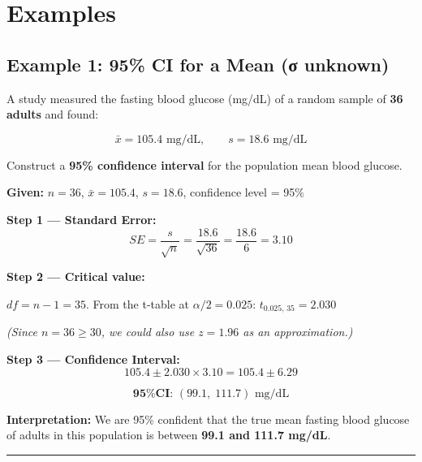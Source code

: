 \documentclass[
  12pt,
  letterpaper,
]{book}
\begin{document}

\chapter{Examples}\label{examples-3}

\section{Example 1: 95\% CI for a Mean (σ
unknown)}\label{example-1-95-ci-for-a-mean-ux3c3-unknown}

A study measured the fasting blood glucose (mg/dL) of a random sample of
\textbf{36 adults} and found:

\[\bar{x} = 105.4 \text{ mg/dL}, \qquad s = 18.6 \text{ mg/dL}\]

Construct a \textbf{95\% confidence interval} for the population mean
blood glucose.

\begin{tcolorbox}[enhanced jigsaw, arc=.35mm, bottomrule=.15mm, bottomtitle=1mm, breakable, colback=white, colbacktitle=quarto-callout-tip-color!10!white, colframe=quarto-callout-tip-color-frame, coltitle=black, left=2mm, leftrule=.75mm, opacityback=0, opacitybacktitle=0.6, rightrule=.15mm, title={✅ Solution}, titlerule=0mm, toprule=.15mm, toptitle=1mm]

\textbf{Given:} \(n = 36\), \(\bar{x} = 105.4\), \(s = 18.6\),
confidence level = 95\%

\textbf{Step 1 --- Standard Error:}
\[SE = \frac{s}{\sqrt{n}} = \frac{18.6}{\sqrt{36}} = \frac{18.6}{6} = 3.10\]

\textbf{Step 2 --- Critical value:}

\(df = n - 1 = 35\). From the t-table at \(\alpha/2 = 0.025\):
\(t_{0.025,\, 35} = 2.030\)

\emph{(Since \(n = 36 \geq 30\), we could also use \(z = 1.96\) as an
approximation.)}

\textbf{Step 3 --- Confidence Interval:}
\[105.4 \pm 2.030 \times 3.10 = 105.4 \pm 6.29\]

\[\textbf{95\% CI: } (99.1, \; 111.7) \text{ mg/dL}\]

\textbf{Interpretation:} We are 95\% confident that the true mean
fasting blood glucose of adults in this population is between
\textbf{99.1 and 111.7 mg/dL}.

\end{tcolorbox}

\begin{center}\rule{0.5\linewidth}{0.5pt}\end{center}
\end{document}

